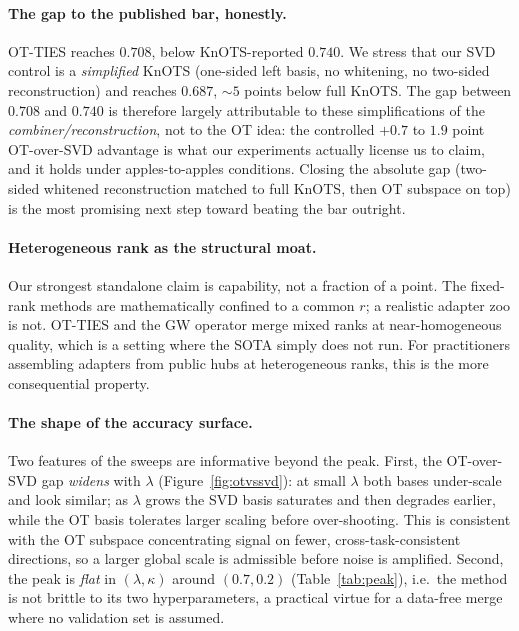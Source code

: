 \documentclass[11pt]{article}
\newcommand{\otties}{\textsc{OT-TIES}}
\begin{document}
\paragraph{The gap to the published bar, honestly.}
\otties{} reaches $0.708$, below KnOTS-reported $0.740$. We stress that our SVD control is a
\emph{simplified} KnOTS (one-sided left basis, no whitening, no two-sided reconstruction) and reaches
$0.687$, $\sim\!5$ points below full KnOTS. The gap between $0.708$ and $0.740$ is therefore largely
attributable to these simplifications of the \emph{combiner/reconstruction}, not to the OT idea: the
controlled $+0.7$ to $1.9$ point OT-over-SVD advantage is what our experiments actually license us to
claim, and it holds under apples-to-apples conditions. Closing the absolute gap (two-sided whitened
reconstruction matched to full KnOTS, then OT subspace on top) is the most promising next step toward
beating the bar outright.

\paragraph{Heterogeneous rank as the structural moat.}
Our strongest standalone claim is capability, not a fraction of a point. The fixed-rank methods are
mathematically confined to a common $r$; a realistic adapter zoo is not. \otties{} and the GW operator
merge mixed ranks at near-homogeneous quality, which is a setting where the SOTA simply does not run.
For practitioners assembling adapters from public hubs at heterogeneous ranks, this is the more
consequential property.

\paragraph{The shape of the accuracy surface.}
Two features of the sweeps are informative beyond the peak. First, the OT-over-SVD gap \emph{widens} with
$\lambda$ (Figure~\ref{fig:otvssvd}): at small $\lambda$ both bases under-scale and look similar; as
$\lambda$ grows the SVD basis saturates and then degrades earlier, while the OT basis tolerates larger
scaling before over-shooting. This is consistent with the OT subspace concentrating signal on fewer,
cross-task-consistent directions, so a larger global scale is admissible before noise is amplified.
Second, the peak is \emph{flat} in $(\lambda,\kappa)$ around $(0.7,0.2)$ (Table~\ref{tab:peak}), i.e.\ the
method is not brittle to its two hyperparameters, a practical virtue for a data-free merge where no
validation set is assumed.
\end{document}
